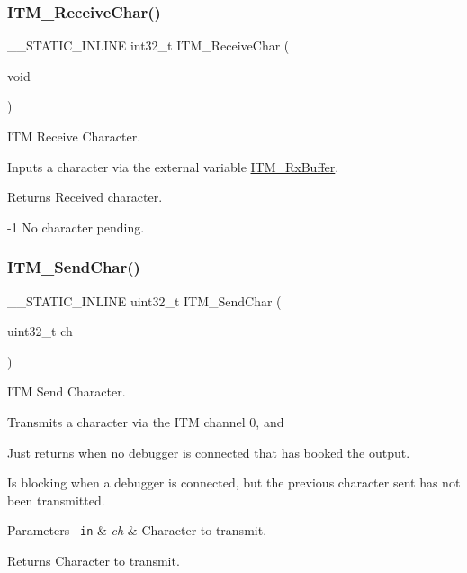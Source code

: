 \subsubsection{\texorpdfstring{ITM\_ReceiveChar()}{ITM\_ReceiveChar()}}
{\footnotesize\ttfamily \+\_\+\+\_\+\+S\+T\+A\+T\+I\+C\+\_\+\+I\+N\+L\+I\+NE int32\+\_\+t I\+T\+M\+\_\+\+Receive\+Char (\begin{DoxyParamCaption}\item[{void}]{ }\end{DoxyParamCaption})}



I\+TM Receive Character. 

Inputs a character via the external variable \mbox{\hyperlink{group___c_m_s_i_s__core___debug_functions_ga12e68e55a7badc271b948d6c7230b2a8}{I\+T\+M\+\_\+\+Rx\+Buffer}}. \begin{DoxyReturn}{Returns}
Received character. 

-\/1 No character pending. 
\end{DoxyReturn}
\mbox{\label{group___c_m_s_i_s__core___debug_functions_gac90a497bd64286b84552c2c553d3419e}} 
\subsubsection{\texorpdfstring{ITM\_SendChar()}{ITM\_SendChar()}}
{\footnotesize\ttfamily \+\_\+\+\_\+\+S\+T\+A\+T\+I\+C\+\_\+\+I\+N\+L\+I\+NE uint32\+\_\+t I\+T\+M\+\_\+\+Send\+Char (\begin{DoxyParamCaption}\item[{uint32\+\_\+t}]{ch }\end{DoxyParamCaption})}



I\+TM Send Character. 

Transmits a character via the I\+TM channel 0, and \begin{DoxyItemize}
\item Just returns when no debugger is connected that has booked the output. \item Is blocking when a debugger is connected, but the previous character sent has not been transmitted. 
\begin{DoxyParams}[1]{Parameters}
\mbox{\texttt{ in}}  & {\em ch} & Character to transmit. \\
\hline
\end{DoxyParams}
\begin{DoxyReturn}{Returns}
Character to transmit. 
\end{DoxyReturn}
\end{DoxyItemize}


